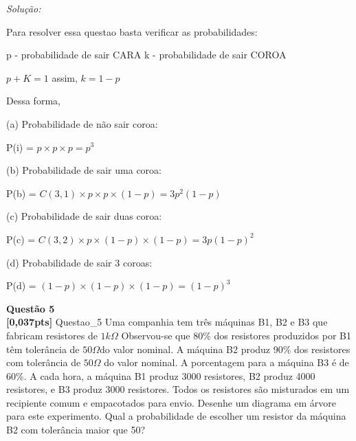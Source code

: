 \documentclass{article}
\newenvironment{problem}[2][Questão]
    { \begin{mdframed}[backgroundcolor=gray!20] \textbf{#1 #2} \\}
    {  \end{mdframed}}
\newenvironment{solution}
    {\textit{Solução:}}
    {}
\begin{document}
\begin{solution}

Para resolver essa questao basta verificar as probabilidades:

p - probabilidade de sair CARA
k - probabilidade de sair COROA

$p+K=1$ assim, $k = 1-p$

Dessa forma,

(a) Probabilidade de não sair coroa:

P(i) = $p\times p \times p = p^3$

(b) Probabilidade de sair uma coroa:

P(b) = $C(3,1) \times p \times p \times (1-p) = 3 p^2 (1-p)$ 

(c) Probabilidade de sair duas coroa:

P(c) = $C(3,2) \times p \times (1-p) \times (1-p) = 3 p (1-p)^2$ 

(d) Probabilidade de sair 3 coroas:

P(d) = $(1-p) \times (1-p) \times (1-p) = (1-p)^3$ 

\end{solution}

\begin{problem}{5}
\textbf{[0,037pts]} Questao\_5 Uma companhia tem três máquinas B1, B2 e B3 que fabricam resistores de $1k\Omega$ Observou-se  que $80\%$ dos resistores produzidos por B1 têm tolerância de $50\Omega$do valor nominal. A máquina B2 produz 90\% dos resistores com tolerância de $50\Omega$ do valor nominal. A porcentagem para a 
máquina  B3  é  de  60\%.  A  cada  hora,  a  máquina  B1  produz  3000  resistores,  B2  produz  4000 
resistores,  e  B3  produz 3000  resistores.  Todos os resistores  são misturados  em  um  recipiente 
comum e  empacotados  para  envio.  Desenhe  um  diagrama  em  árvore  para este  experimento. 
Qual a probabilidade de escolher um resistor da máquina B2 com tolerância maior que 50?

\end{problem}
\end{document}
